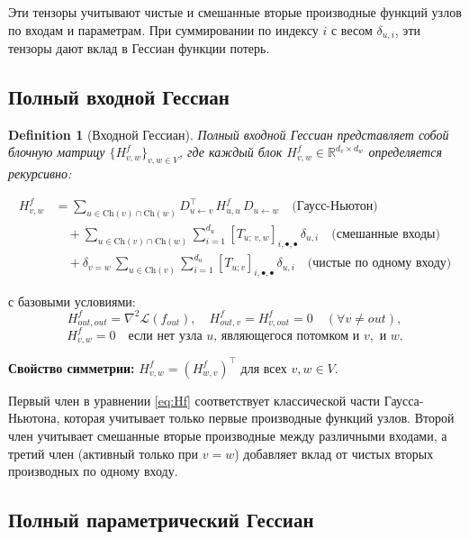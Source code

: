 \documentclass[11pt]{article}
\newtheorem{definition}{Definition}
\newcommand{\Ch}{\mathrm{Ch}} %
\begin{document}
Эти тензоры учитывают чистые и смешанные вторые производные функций узлов по входам и параметрам. При
суммировании по индексу $i$ с весом $\delta_{u,i}$, эти тензоры дают вклад в Гессиан функции потерь.

\subsection{Полный входной Гессиан}

\begin{definition}[Входной Гессиан]
  Полный входной Гессиан представляет собой блочную матрицу $\{H^f_{v,w}\}_{v,w\in V}$, где каждый блок
  $H^f_{v,w}\in\mathbb{R}^{d_v\times d_w}$ определяется рекурсивно:
\end{definition}

\begin{equation}\label{eq:Hf}
  \boxed{
    \begin{split}
      H^f_{v,w}
      &=
      \sum_{u\in\Ch(v)\cap\Ch(w)}
      D_{u\gets v}^\top\,H^f_{u,u}\,D_{u\gets w}
      \quad\text{(Гаусс-Ньютон)}\\
      &\quad+
      \sum_{u\in\Ch(v)\cap\Ch(w)}
      \sum_{i=1}^{d_u}
      [T_{u;\,v,w}]_{i,\bullet,\bullet}\,\delta_{u,i}
      \quad\text{(смешанные входы)}\\
      &\quad+
      \delta_{v=w}\,
      \sum_{u\in\Ch(v)}
      \sum_{i=1}^{d_u}
      [T_{u;v}]_{i,\bullet,\bullet}\,\delta_{u,i}
      \quad\text{(чистые по одному входу)}
    \end{split}
  }
\end{equation}

с базовыми условиями:
\[
  H^f_{out,out} = \nabla^2\mathcal L(f_{out}),
  \quad
  H^f_{out,v} = H^f_{v,out} = 0\quad (\forall v\neq out),
\]
\[
  H^f_{v,w} = 0
  \quad\text{если нет узла }u\text{, являющегося потомком и }v,\text{ и }w.
\]

\textbf{Свойство симметрии:} $H^f_{v,w}=(H^f_{w,v})^\top$ для всех $v,w \in V$.

Первый член в уравнении \eqref{eq:Hf} соответствует классической части Гаусса-Ньютона, которая учитывает
только первые производные функций узлов. Второй член учитывает смешанные вторые производные между различными
входами, а третий член (активный только при $v=w$) добавляет вклад от чистых вторых производных по одному входу.

\subsection{Полный параметрический Гессиан}
\end{document}
